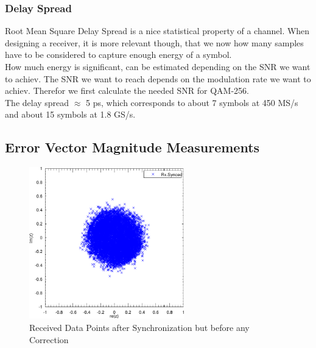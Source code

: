 \subsubsection{Delay Spread}
Root Mean Square Delay Spread is a nice statistical property of a channel.
When designing a receiver, it is more relevant though, that we now how many
samples have to be considered to capture enough energy of a symbol. \\

How much energy is significant, can be estimated depending on the \gls{SNR}
we want to achiev. The \gls{SNR} we want to reach depends on the modulation rate
we want to achiev. Therefor we first calculate the needed \gls{SNR} for
\gls{QAM}-256. \\

The delay spread $\approx $ 5 ps, which corresponds to about 7 symbols
at 450 MS/s and about 15 symbols at 1.8 GS/s. \\

\subsection{Error Vector Magnitude Measurements}
\begin{figure}[p]
  \centering
  \includegraphics[width=0.6\textwidth]{figures/matlab/res_450_cp_synced}
  \caption{Received Data Points after Synchronization but before any Correction}
  \label{fig:res_450_cp_synced}
\end{figure}

